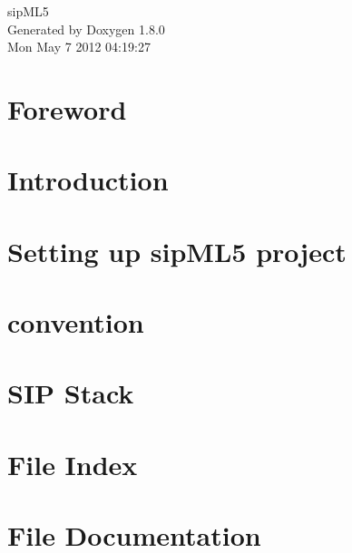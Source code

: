 \documentclass{book}
\begin{document}
\begin{titlepage}
\vspace*{7cm}
\begin{center}
{\Large sip\-M\-L5 }\\
\vspace*{1cm}
{\large Generated by Doxygen 1.8.0}\\
\vspace*{0.5cm}
{\small Mon May 7 2012 04:19:27}\\
\end{center}
\end{titlepage}
\clearemptydoublepage
{}
\tableofcontents
\clearemptydoublepage
{}
\chapter{Foreword}
\label{index}
\chapter{Introduction}
\label{Introduction}

\chapter{Setting up sip\-M\-L5 project}
\label{page__Setting_Up_sipML5_project}

\chapter{convention}
\label{Conding}

\chapter{S\-I\-P Stack}
\label{page_tsip_stack}

\chapter{File Index}

\chapter{File Documentation}

\printindex
\end{document}
